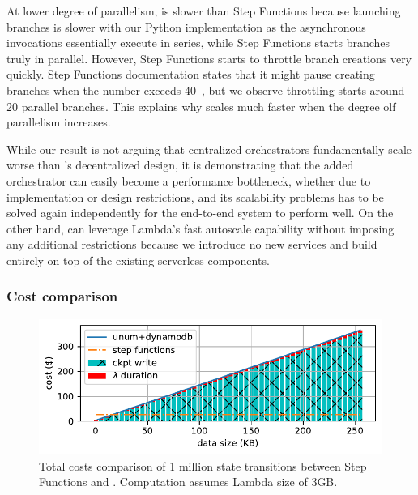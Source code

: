 At lower degree of parallelism, \name{} is slower than Step Functions because
launching branches is slower with our Python implementation as the
asynchronous invocations essentially execute in series, while Step Functions
starts branches truly in parallel. However, Step Functions starts to throttle
branch creations very quickly. Step Functions documentation states that it
might pause creating branches when the number exceeds
40~\cite{aws-step-functions-map-state}, but we observe throttling starts
around 20 parallel branches. This explains why \name{} scales much faster when
the degree olf parallelism increases.

While our result is not arguing that centralized orchestrators fundamentally
scale worse than \name{}'s decentralized design, it is demonstrating that the
added orchestrator can easily become a performance bottleneck, whether due to
implementation or design restrictions, and its scalability problems has to be
solved again independently for the end-to-end system to perform well. On the
other hand, \name{} can leverage Lambda's fast autoscale capability without
imposing any additional restrictions because we introduce no new services and
build entirely on top of the existing serverless components.

\subsubsection{Cost comparison}

\begin{figure}[t!]
    \centering
    \includegraphics[width=\columnwidth]{figures/TotalCost.pdf}
    \caption{Total costs comparison of 1 million state transitions between
    Step Functions and \name{}. Computation assumes Lambda size of 3GB. }
    \label{fig:total-costs-single}
\end{figure}

